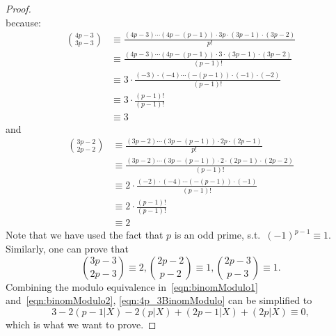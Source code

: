 \documentclass{article}
\theoremstyle{definition}
\numberwithin{equation}{theorem}
\numberwithin{figure}{theorem}
\newcommand{\sothat}{s.t.\ }
\newcommand{\numSumSubset}[2]{\ensuremath{(#1|#2)}}
\begin{document}
\begin{proof}
\begin{equation}
        \end{equation}
        because:
        \begin{align*}
            \binom{4p-3}{3p-3} &\equiv \frac{(4p-3) \cdots (4p-(p-1)) \cdot 3p \cdot (3p-1) \cdot (3p-2)}{p!}\\
            &\equiv \frac{(4p-3) \cdots (4p-(p-1)) \cdot 3 \cdot (3p-1) \cdot (3p-2)}{(p-1)!} \\
            &\equiv 3 \cdot \frac{(-3) \cdot (-4) \cdots (-(p-1)) \cdot(-1)\cdot(-2)}{(p-1)!}\\
            &\equiv 3 \cdot \frac{(p-1)!}{(p-1)!}\\
            &\equiv 3
        \end{align*}        
        and
        \begin{align*}
            \binom{3p-2}{2p-2} &\equiv \frac{(3p-2) \cdots (3p-(p-1)) \cdot 2p \cdot (2p-1)}{p!}\\
            &\equiv \frac{(3p-2) \cdots (3p-(p-1)) \cdot 2 \cdot (2p-1) \cdot (2p-2)}{(p-1)!} \\
            &\equiv 2 \cdot \frac{(-2) \cdot (-4) \cdots (-(p-1)) \cdot(-1)}{(p-1)!}\\
            &\equiv 2 \cdot \frac{(p-1)!}{(p-1)!}\\
            &\equiv 2
        \end{align*}
        Note that we have used the fact that $p$ is an odd prime, \sothat $(-1)^{p-1} \equiv 1$.
        Similarly, one can prove that
        \begin{equation}\label{eqn:binomModulo2}
            \binom{3p-3}{2p-3}\equiv 2, \binom{2p-2}{p-2} \equiv 1, \binom{2p-3}{p-3}\equiv 1.
        \end{equation}
        Combining the modulo equivalence in~\eqref{eqn:binomModulo1} and~\eqref{eqn:binomModulo2}, \eqref{eqn:4p_3BinomModulo} can be simplified to
        \begin{equation}
            3 - 2\numSumSubset{p-1}{X} - 2\numSumSubset{p}{X} + \numSumSubset{2p-1}{X} + \numSumSubset{2p}{X} \equiv 0, 
        \end{equation}
        which is what we want to prove.
        \end{proof}
\end{document}

